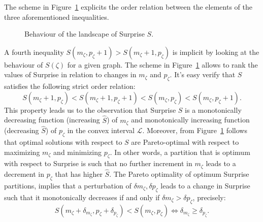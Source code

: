 The scheme in Figure~\ref{fig:surprisebehaviour} explicits the order relation between the elements of the three aforementioned inequalities.
\begin{figure}[htb]
\centering
{}
\caption{Behaviour of the landscape of Surprise $S$.}
\label{fig:surprisebehaviour}
\end{figure}

A fourth inequality $S(m_\zeta,p_\zeta+1)>S(m_\zeta+1,p_\zeta)$ is implicit by looking at the behaviour of $S(\zeta)$ for a given graph. 
The scheme in Figure~\ref{fig:surprisebehaviour} allows to rank the values of Surprise in relation to changes in $m_\zeta$ and $p_\zeta$. It's easy  verify that $S$ satisfies the following strict order relation:
\begin{equation}\label{eq:surpriseorderrelation}
S(m_\zeta+1,p_\zeta)<S(m_\zeta+1,p_\zeta+1)<S(m_\zeta,p_\zeta)<S(m_\zeta,p_\zeta+1).
\end{equation}
This property leads us to the observation that Surprise $S$ is a monotonically decreasing function (increasing $\hat{S}$) of $m_\zeta$ and monotonically increasing function (decreasing $\hat{S}$) of $p_\zeta$ in the convex interval $\mathcal{L}$.
Moreover, from Figure~\ref{fig:surprisebehaviour} follows that optimal solutions with respect to $S$ are Pareto-optimal with respect to maximizing $m_\zeta$ and minimizing $p_\zeta$.
In other words, a partition that is optimum with respect to Surprise is such that no further increment in $m_\zeta$ leads to a decrement in $p_\zeta$ that has higher $\hat{S}$.
The Pareto optimality of optimum Surprise partitions, implies that a perturbation of $\delta m_\zeta, \delta p_\zeta$ leads to a change in Surprise such that it monotonically decreases if and only if $\delta m_\zeta > \delta p_\zeta$, precisely:
\begin{equation}\label{eq:resolution_limit_condition}
S(m_\zeta + \delta_{m_\zeta}, p_\zeta + \delta_{p_\zeta}) < S(m_\zeta,p_\zeta) \iff \delta_{m_\zeta} \geq \delta_{p_\zeta}.
\end{equation}


